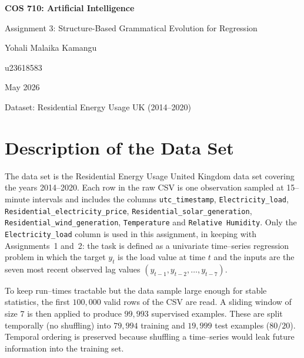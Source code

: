 \documentclass[12pt,a4paper]{article}
\begin{document}
\begin{titlepage}
    \centering
    \vspace*{2cm}
    {\LARGE\bfseries COS 710: Artificial Intelligence\par}
    \vspace{0.5cm}
    {\Large Assignment 3: Structure-Based Grammatical Evolution for Regression\par}
    \vspace{1.5cm}
    {\large Yohali Malaika Kamangu\par}
    {\large u23618583\par}
    \vspace{0.5cm}
    {\large May 2026\par}
    \vspace{1.5cm}
    {\normalsize Dataset: Residential Energy Usage UK (2014--2020)\par}
\end{titlepage}

\tableofcontents
\newpage

\section{Description of the Data Set}

The data set is the Residential Energy Usage United Kingdom data set
covering the years 2014--2020. Each row in the raw CSV is one observation
sampled at 15--minute intervals and includes the columns
\texttt{utc\_timestamp}, \texttt{Electricity\_load},
\texttt{Residential\_electricity\_price},
\texttt{Residential\_solar\_generation},
\texttt{Residential\_wind\_generation}, \texttt{Temperature} and
\texttt{Relative Humidity}. Only the \texttt{Electricity\_load} column is
used in this assignment, in keeping with Assignments~1 and~2: the task is
defined as a univariate time--series regression problem in which the
target $y_t$ is the load value at time $t$ and the inputs are the seven
most recent observed lag values $(y_{t-1}, y_{t-2}, \ldots, y_{t-7})$.

To keep run--times tractable but the data sample large enough for
stable statistics, the first $100{,}000$ valid rows of the CSV are read.
A sliding window of size 7 is then applied to produce
$99{,}993$ supervised examples. These are split temporally
(no shuffling) into $79{,}994$ training and $19{,}999$ test
examples ($80/20$). Temporal ordering is preserved because shuffling a
time--series would leak future information into the training set.
\end{document}
